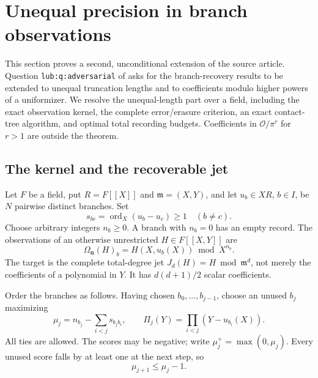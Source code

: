 \section{Unequal precision in branch observations}
\label{sec:unequal-branches}

This section proves a second, unconditional extension of the source article.
Question \texttt{lub:q:adversarial} of \cite{article} asks for the branch-recovery results to be extended
to unequal truncation lengths and to coefficients modulo higher powers of a
uniformizer.  We resolve the unequal-length part over a field, including the
exact observation kernel, the complete error/erasure criterion, an exact
contact-tree algorithm, and optimal total recording budgets.  Coefficients in
$\mathcal O/\pi^r$ for $r>1$ are outside the theorem.

\subsection{The kernel and the recoverable jet}

Let $F$ be a field, put $R=F[[X]]$ and $\mathfrak m=(X,Y)$, and let
$u_b\in XR$, $b\in I$, be $N$ pairwise distinct branches.  Set
\[
 s_{bc}=\operatorname{ord}_X(u_b-u_c)\ge1\quad(b\ne c).
\]
Choose arbitrary integers $n_b\ge0$.  A branch with $n_b=0$ has an empty record.
The observations of an otherwise unrestricted $H\in F[[X,Y]]$ are
\[
 \Omega_{\boldsymbol n}(H)_b
   =H(X,u_b(X))\bmod X^{n_b}.
\]
The target is the complete total-degree jet
$J_d(H)=H\bmod\mathfrak m^d$, not merely the coefficients of a polynomial in $Y$.
It has $d(d+1)/2$ scalar coefficients.

Order the branches as follows.  Having chosen $b_0,\ldots,b_{j-1}$, choose an
unused $b_j$ maximizing
\begin{equation}
 \mu_j=n_{b_j}-\sum_{i<j}s_{b_jb_i},
 \qquad
 \Pi_j(Y)=\prod_{i<j}(Y-u_{b_i}(X)).
 \label{eq:unequal-greedy}
\end{equation}
All ties are allowed.  The scores may be negative; write
$\mu_j^+=\max(0,\mu_j)$.  Every unused score falls by at least one at the next
step, so
\begin{equation}
 \mu_{j+1}\le\mu_j-1.
 \label{eq:unequal-descent}
\end{equation}

